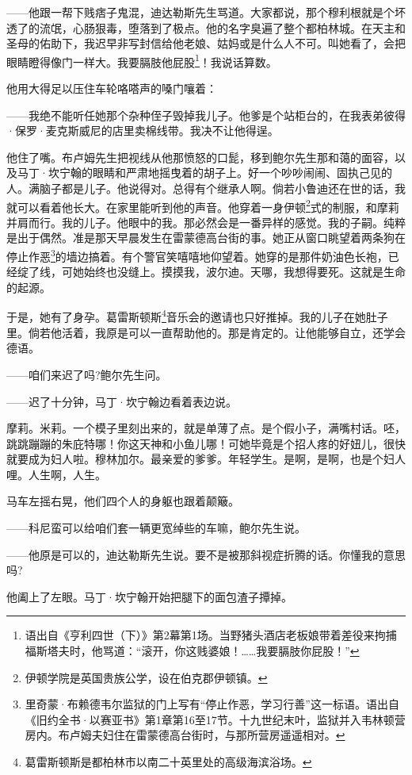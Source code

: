 \par ——他跟一帮下贱痞子鬼混，迪达勒斯先生骂道。大家都说，那个穆利根就是个坏透了的流氓，心肠狠毒，堕落到了极点。他的名字臭遍了整个都柏林城。在天主和圣母的佑助下，我迟早非写封信给他老娘、姑妈或是什么人不可。叫她看了，会把眼睛瞪得像门一样大。我要膈肢他屁股\footnote{语出自《亨利四世（下）》第2幕第1场。当野猪头酒店老板娘带着差役来拘捕福斯塔夫时，他骂道：“滚开，你这贱婆娘！……我要膈肢你屁股！”}！我说话算数。
\par 他用大得足以压住车轮咯嗒声的嗓门嚷着：
\par ——我绝不能听任她那个杂种侄子毁掉我儿子。他爹是个站柜台的，在我表弟彼得·保罗·麦克斯威尼的店里卖棉线带。我决不让他得逞。
\par 他住了嘴。布卢姆先生把视线从他那愤怒的口髭，移到鲍尔先生那和蔼的面容，以及马丁·坎宁翰的眼睛和严肃地摇曳着的胡子上。好一个吵吵闹闹、固执己见的人。满脑子都是儿子。他说得对。总得有个继承人啊。倘若小鲁迪还在世的话，我就可以看着他长大。在家里能听到他的声音。他穿着一身伊顿\footnote{伊顿学院是英国贵族公学，设在伯克郡伊顿镇。}式的制服，和摩莉并肩而行。我的儿子。他眼中的我。那必然会是一番异样的感觉。我的子嗣。纯粹是出于偶然。准是那天早晨发生在雷蒙德高台街的事。她正从窗口眺望着两条狗在停止作恶\footnote{里奇蒙·布赖德韦尔监狱的门上写有“停止作恶，学习行善”这一标语。语出自《旧约全书·以赛亚书》第1章第16至17节。十九世纪末叶，监狱并入韦林顿营房内。布卢姆夫妇住在雷蒙德高台街时，与那所营房遥遥相对。}的墙边搞着。有个警官笑嘻嘻地仰望着。她穿的是那件奶油色长袍，已经绽了线，可她始终也没缝上。摸摸我，波尔迪。天哪，我想得要死。这就是生命的起源。
\par 于是，她有了身孕。葛雷斯顿斯\footnote{葛雷斯顿斯是都柏林市以南二十英里处的高级海滨浴场。}音乐会的邀请也只好推掉。我的儿子在她肚子里。倘若他活着，我原是可以一直帮助他的。那是肯定的。让他能够自立，还学会德语。
\par ——咱们来迟了吗?鲍尔先生问。
\par ——迟了十分钟，马丁·坎宁翰边看着表边说。
\par 摩莉。米莉。一个模子里刻出来的，就是单薄了点。是个假小子，满嘴村话。呸，跳跳蹦蹦的朱庇特哪！你这天神和小鱼儿哪！可她毕竟是个招人疼的好妞儿，很快就要成为妇人啦。穆林加尔。最亲爱的爹爹。年轻学生。是啊，是啊，也是个妇人哩。人生啊，人生。
\par 马车左摇右晃，他们四个人的身躯也跟着颠簸。
\par ——科尼蛮可以给咱们套一辆更宽绰些的车嘛，鲍尔先生说。
\par ——他原是可以的，迪达勒斯先生说。要不是被那斜视症折腾的话。你懂我的意思吗?
\par 他阖上了左眼。马丁·坎宁翰开始把腿下的面包渣子撢掉。
